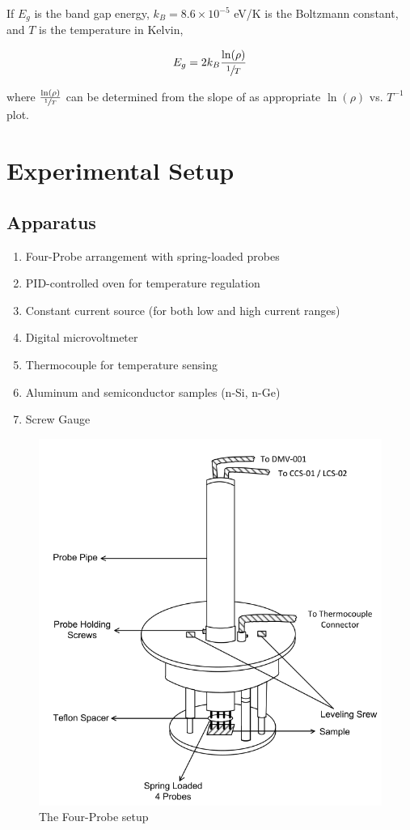 If $E_g$ is the band gap energy, $k_B = 8.6\times 10^{-5}$ eV/K is the Boltzmann constant, and $T$ is the temperature in Kelvin,

\begin{equation}\label{e3}
    E_g = 2k_B\frac{\ln(\rho)}{\sfrac{1}{T}}
\end{equation}

where $\frac{\ln(\rho)}{\sfrac{1}{T}}$ can be determined from the slope of as appropriate $\ln(\rho)$ vs. $T^{-1}$ plot.
\section{Experimental Setup}

\subsection*{Apparatus}

\begin{enumerate}
    \item Four-Probe arrangement with spring-loaded probes
    \item PID-controlled oven for temperature regulation
    \item Constant current source (for both low and high current ranges)
    \item Digital microvoltmeter
    \item Thermocouple for temperature sensing
    \item Aluminum and semiconductor samples (n-Si, n-Ge)
    \item Screw Gauge\\
\end{enumerate}

\begin{figure}
    \centering
    \includegraphics[width=1\columnwidth]{images/setup.png}
    \caption{The Four-Probe setup}
\end{figure}

